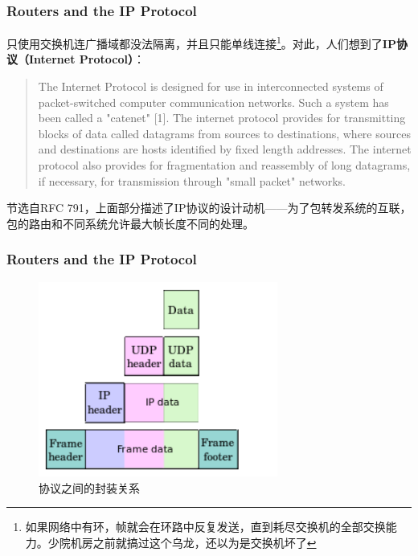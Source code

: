 \documentclass[11pt]{beamer}
\begin{document}
\begin{frame}
\frametitle{Routers and the IP Protocol}
只使用交换机连广播域都没法隔离，并且只能单线连接\footnote{如果网络中有环，帧就会在环路中反复发送，直到耗尽交换机的全部交换能力。少院机房之前就搞过这个乌龙，还以为是交换机坏了}。对此，人们想到了\textbf{IP协议（Internet Protocol）}：
\begin{quote}
The Internet Protocol is designed for use in interconnected systems of packet-switched computer communication networks.  Such a system has been called a "catenet" [1].  The internet protocol provides for  transmitting blocks of data called datagrams from sources to destinations, where sources and destinations are hosts identified by fixed length addresses.  The internet protocol also provides for fragmentation and reassembly of long datagrams, if necessary, for transmission through "small packet" networks.
\end{quote}

节选自RFC 791，上面部分描述了IP协议的设计动机——为了包转发系统的互联，包的路由和不同系统允许最大帧长度不同的处理。
\end{frame}

\begin{frame}
\frametitle{Routers and the IP Protocol}
\begin{figure}
\includegraphics[width=0.7\textwidth]{encapsule.png}
\caption{协议之间的封装关系}
\end{figure}
\end{frame}
\end{document}
